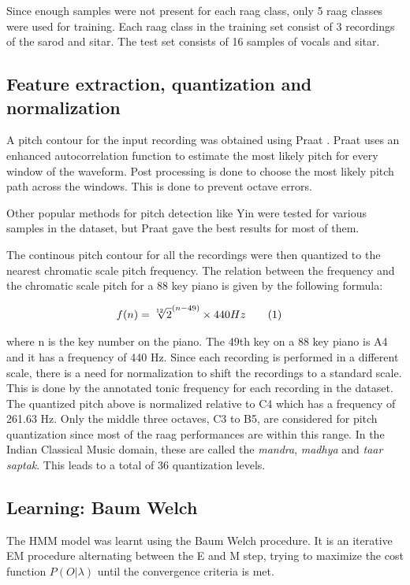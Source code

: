 \documentclass[letterpaper, 10 pt, conference]{ieeeconf}  %
\newcommand\numberthis{\addtocounter{equation}{1}\tag{\theequation}}
\begin{document}
Since enough samples were not present for each raag class, only 5 raag classes were used for training. 
Each raag class in the training set consist of 3 recordings of the sarod and sitar. The test set consists of 16 samples of vocals and sitar.

   
\subsection{Feature extraction, quantization and normalization}
A pitch contour for the input recording was obtained using Praat \cite{c2}. Praat uses an enhanced autocorrelation function to estimate the most likely pitch for every window of the waveform. Post processing is done to choose the most likely pitch path across the windows. This is done to prevent octave errors. 
   
Other popular methods for pitch detection like Yin \cite{c3} were tested for various samples in the dataset, but Praat gave the best results for most of them. 

The continous pitch contour for all the recordings were then quantized to the nearest chromatic scale pitch frequency. The relation between the frequency and the chromatic scale pitch for a 88 key piano is given by the following formula:

\begin{align*}
	f(n) =&\;  \sqrt[12]{2}^{(n-49)} \times 440 Hz \numberthis
\end{align*}

where n is the key number on the piano. The 49th key on a 88 key piano is A4 and it has a frequency of 440 Hz. 
Since each recording is performed in a different scale, there is a need for normalization to shift the recordings to a standard scale. This is done by the annotated tonic frequency for each recording in the dataset.
The quantized pitch above is normalized relative to C4 which has a frequency of 261.63 Hz. 
Only the middle three octaves, C3 to B5, are considered for pitch quantization since most of the raag performances are within this range. In the Indian Classical Music domain, these are called the \textit{mandra}, \textit{madhya} and \textit{taar} \textit{saptak}. This leads to a total of 36 quantization levels. 


\subsection{Learning: Baum Welch }
The HMM model was learnt using the Baum Welch procedure. It is an iterative EM procedure alternating between the E and M step, trying to maximize the cost function $P(O|\lambda)$ until the convergence criteria is met. \\
\end{document}
